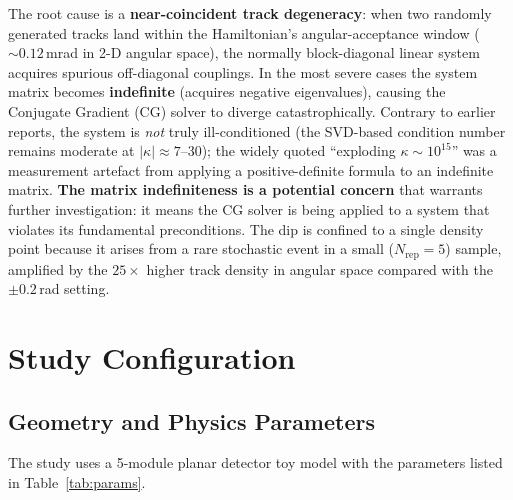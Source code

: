 \documentclass[12pt,a4paper]{article}
\begin{document}
\noindent The root cause is a \textbf{near-coincident track degeneracy}: when
two randomly generated tracks land within the Hamiltonian's angular-acceptance
window ($\sim\!0.12$\,mrad in 2-D angular space), the normally block-diagonal
linear system acquires spurious off-diagonal couplings.
In the most severe cases the system matrix becomes \textbf{indefinite}
(acquires negative eigenvalues), causing the
Conjugate Gradient (CG) solver to diverge catastrophically.
Contrary to earlier reports, the system is \emph{not} truly ill-conditioned
(the SVD-based condition number remains moderate at $|\kappa| \approx 7\text{--}30$);
the widely quoted ``exploding $\kappa \sim 10^{15}$'' was a measurement artefact
from applying a positive-definite formula to an indefinite matrix.
\textbf{The matrix indefiniteness is a potential concern}
that warrants further investigation: it means the CG solver is being applied
to a system that violates its fundamental preconditions.
The dip is confined to a single density point because it arises from a rare
stochastic event in a small ($N_\text{rep}=5$) sample, amplified by the
$25\times$ higher track density in angular space compared with the $\pm0.2$\,rad
setting.

\section{Study Configuration}
\label{sec:config}

\subsection{Geometry and Physics Parameters}

The study uses a 5-module planar detector toy model with the parameters listed
in Table~\ref{tab:params}.
\end{document}
